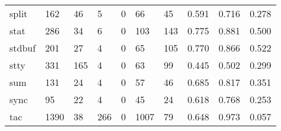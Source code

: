 \begin{longtable}{lp{2.0cm}p{2.0cm}p{2.0cm}p{2.0cm}p{2.0cm}p{2.0cm}p{2.0cm}p{2.0cm}p{2.0cm}}
split     &                    162 &                                 46 &                                 5 &                                0 &                                66 &                              45 &                                0.591 &                                  0.716 &                                0.278 \\
stat      &                    286 &                                 34 &                                 6 &                                0 &                               103 &                             143 &                                0.775 &                                  0.881 &                                0.500 \\
stdbuf    &                    201 &                                 27 &                                 4 &                                0 &                                65 &                             105 &                                0.770 &                                  0.866 &                                0.522 \\
stty      &                    331 &                                165 &                                 4 &                                0 &                                63 &                              99 &                                0.445 &                                  0.502 &                                0.299 \\
sum       &                    131 &                                 24 &                                 4 &                                0 &                                57 &                              46 &                                0.685 &                                  0.817 &                                0.351 \\
sync      &                     95 &                                 22 &                                 4 &                                0 &                                45 &                              24 &                                0.618 &                                  0.768 &                                0.253 \\
tac       &                   1390 &                                 38 &                               266 &                                0 &                              1007 &                              79 &                                0.648 &                                  0.973 &                                0.057 \\

\end{longtable}
